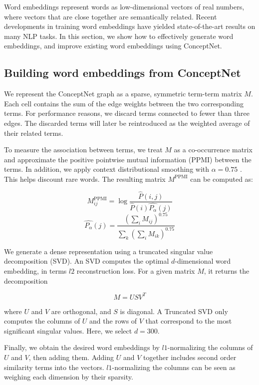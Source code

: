 \documentclass[letterpaper]{article}
\begin{document}
Word embeddings represent words as low-dimensional vectors of real numbers,
where vectors that are close together are semantically related. Recent
developments in training word embeddings have yielded state-of-the-art results
on many NLP tasks. In this section, we show how to effectively generate
word embeddings, and improve existing word embeddings using ConceptNet.

\subsection{Building word embeddings from ConceptNet}

We represent the ConceptNet graph as a sparse, symmetric term-term matrix $M$.
Each cell contains the sum of the edge weights between the two corresponding
terms. For performance reasons, we discard terms connected to fewer than three
edges. The discarded terms will later be reintroduced as the weighted average of
their related terms.

To measure the association between terms, we treat $M$ as a co-occurrence
matrix and approximate the positive pointwise mutual information (PPMI) between
the terms. In addition, we apply context distributional smoothing with
$\alpha=0.75$ \cite{levy2015embeddings}. This helps discount rare words. The
resulting matrix $M^\text{PPMI}$ can be computed as:

$$
M^\text{PPMI}_{ij} =
\log \frac
  {\hat{P} \left(i, j\right)}
  {\hat{P} \left(i\right) \hat{P_\alpha} \left(j\right)}
$$
$$
\hat{P_\alpha} \left(j\right) =
\frac
  {\left(\sum_i{M_{ij}}\right)^{0.75}}
  {\sum_k{\left(\sum_i{M_{ik}}\right)^{0.75}}}
$$

We generate a dense representation using a truncated singular value
decomposition (SVD). An SVD computes the optimal $d$-dimensional word embedding,
in terms $l2$ reconstruction loss. For a given matrix $M$, it returns the
decomposition

$$
M = USV^T
$$

where $U$ and $V$ are orthogonal, and $S$ is diagonal. A Truncated SVD only
computes the columns of $U$ and the rows of $V$ that correspond to the most
significant singular values. Here, we select $d=300$.

Finally, we obtain the desired word embeddings by $l1$-normalizing the columns
of $U$ and $V$, then adding them. Adding $U$ and $V$ together includes second
order similarity terms into the vectors. $l1$-normalizing the columns can be
seen as weighing each dimension by their sparsity.
\end{document}

